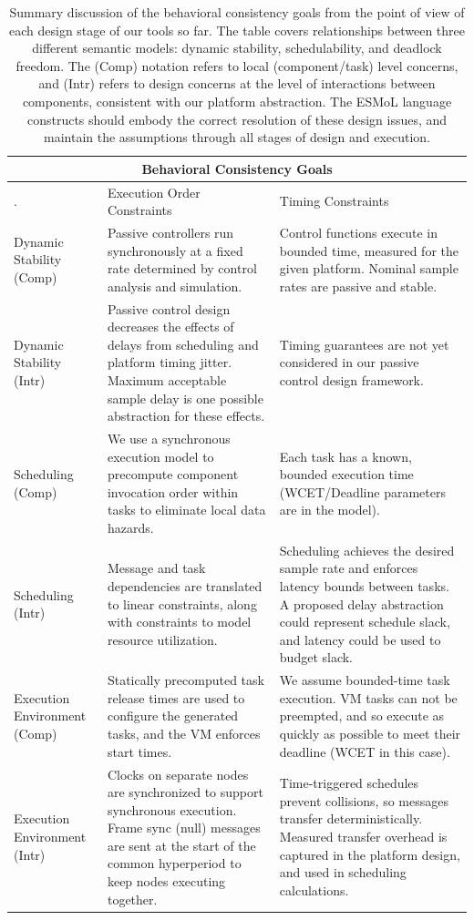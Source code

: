 \begin{table}[htb]
	\centering
		\begin{tabular}[width=0.75\columnwidth]{@{\extracolsep{\fill}} |
p{1.7cm} | p{4.6cm} | p{4.6cm} | }
		\hline
		\multicolumn{3}{|c|}{Behavioral Consistency Goals} \\
		\hline
		. & Execution Order Constraints & Timing Constraints \\ \hline \hline
		Dynamic Stability (Comp) & Passive controllers run synchronously at a fixed rate determined by control analysis and simulation. & Control functions execute in bounded time, measured for the given platform. Nominal sample rates are passive and stable. \\ \hline
		Dynamic Stability (Intr) & Passive control design decreases the effects of delays from scheduling and platform timing jitter. Maximum acceptable sample delay is one possible abstraction for these effects. & Timing guarantees are not yet considered in our passive control design framework. \\ \hline
		\hline
		Scheduling (Comp) & We use a synchronous execution model to precompute component invocation order within tasks to eliminate local data hazards. & Each task has a known, bounded execution time (WCET/Deadline parameters are in the model).  \\ \hline
		Scheduling (Intr) & Message and task dependencies are translated to linear constraints, along with constraints to model resource utilization. & Scheduling achieves the desired sample rate and enforces latency bounds between tasks.  A proposed delay abstraction could represent schedule slack, and latency could be used to budget slack. \\ \hline
 \hline
		Execution Environment (Comp) & Statically precomputed task
release times are used to configure the generated tasks, and the VM enforces
start times. & We assume bounded-time task execution.  VM tasks can not be
preempted, and so execute as quickly as possible to meet their deadline (WCET in
this case). \\ \hline
		Execution Environment (Intr) & Clocks on separate nodes are
synchronized to support synchronous execution.  Frame sync (null) messages are
sent at the start of the common hyperperiod to keep nodes executing together.  &
Time-triggered schedules prevent collisions, so messages transfer
deterministically. Measured transfer overhead is captured in the platform
design, and used in scheduling calculations. \\ \hline
		\end{tabular}
	\caption{Summary discussion of the behavioral consistency goals from the
point of view of each design stage of our tools so far.  The table covers
relationships between three different semantic models: dynamic stability,
schedulability, and deadlock freedom. The (Comp) notation refers to local
(component/task) level concerns, and (Intr) refers to design concerns at the
level of interactions between components, consistent with our platform
abstraction.  The ESMoL language constructs should embody the correct
resolution of these design issues, and maintain the assumptions through all
stages of design and execution.}
	\label{tab:consistencyTools}
\end{table}